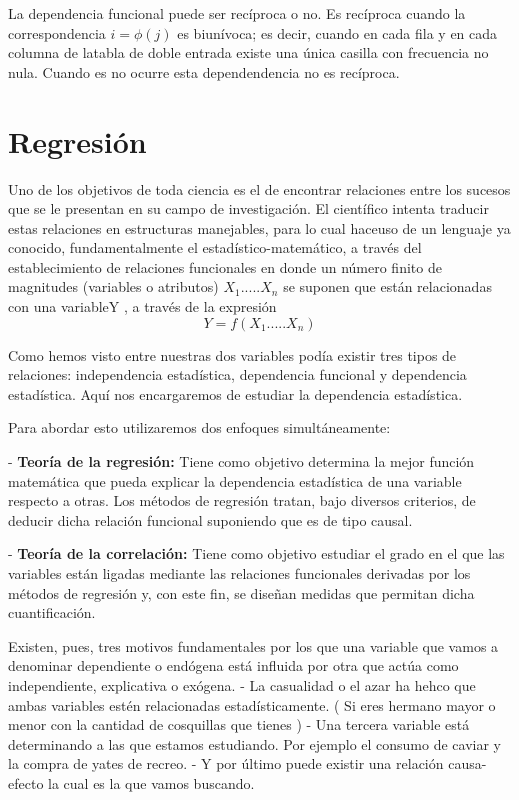 \documentclass{article}
\begin{document}
	La dependencia funcional puede ser recíproca o no. Es recíproca cuando la correspondencia $i = \phi (j)$ es biunívoca; es decir, cuando en cada fila y en cada columna de latabla de doble entrada existe una única casilla con frecuencia no nula. Cuando es no ocurre esta dependendencia no es recíproca.
	
\section{Regresión}
	Uno de los objetivos de toda ciencia es el de encontrar relaciones entre los sucesos que se le presentan en su campo de investigación. El científico intenta traducir estas relaciones en estructuras manejables, para lo cual haceuso de un lenguaje ya conocido, fundamentalmente el estadístico-matemático, a través del establecimiento de relaciones funcionales en donde un número finito de magnitudes (variables o atributos) $X_1 ..... X_n$ se suponen que están relacionadas con una variableY , a través de la expresión $$ Y = f (X_1 ..... X_n)$$
	
	Como hemos visto entre nuestras dos variables podía existir tres tipos de relaciones: independencia estadística, dependencia funcional y dependencia estadística. Aquí nos encargaremos de estudiar la dependencia estadística.
	\vspace{2mm}
	
	Para abordar esto utilizaremos dos enfoques simultáneamente:
	
	 - \textbf{Teoría de la regresión:} Tiene como objetivo determina la mejor función matemática que pueda explicar la dependencia estadística de una variable respecto a otras. Los métodos de regresión tratan, bajo diversos criterios, de deducir dicha relación funcional suponiendo que es de tipo causal.
	 
	 \vspace{2mm}
	 - \textbf{Teoría de la correlación:} Tiene como objetivo estudiar el grado en el que las variables están ligadas mediante las relaciones funcionales derivadas por los métodos de regresión y, con este fin, se diseñan medidas que permitan dicha cuantificación.
	 
	 \vspace{2mm}
	 Existen, pues, tres motivos fundamentales por los que una variable que vamos a denominar dependiente o endógena está influida por otra que actúa como independiente, explicativa o exógena.
	 - La casualidad o el azar ha hehco que ambas variables estén relacionadas estadísticamente. ( Si eres hermano mayor o menor con la cantidad de cosquillas que tienes )
	 - Una tercera variable está determinando a las que estamos estudiando. Por ejemplo el consumo de caviar y la compra de yates de recreo.
	 - Y por último puede existir una relación causa-efecto la cual es la que vamos buscando.
\end{document}

